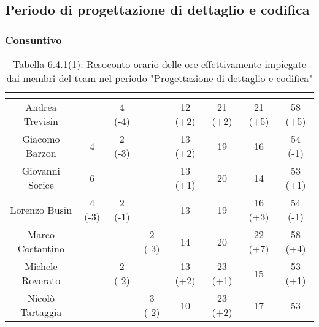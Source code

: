 \subsection{Periodo di progettazione di dettaglio e codifica}
\subsubsection{Consuntivo}
\renewcommand{\arraystretch}{1.5}
\begin{table}[H]
\begin{center}
\begin{tabular}{|c|c|c|c|c|c|c|c|}
\hline
\rowcolor{title_row}
\textbf{\color{title_text}{Nome}} & \textbf{\color{title_text}{Resp.}} & \textbf{\color{title_text}{Ammi.}} & \textbf{\color{title_text}{Analist.}} & \textbf{\color{title_text}{Progett.}} & \textbf{\color{title_text}{Program.}} & \textbf{\color{title_text}{Verific.}} & \textbf{\color{title_text}{Totale}} \\ \hline
Andrea Trevisin  & & 4 (-4) & & 12 (+2) & 21 (+2) & 21 (+5) & 58 (+5) \\ \hline
Giacomo Barzon   & 4 & 2 (-3) & & 13 (+2) & 19 & 16 & 54 (-1)  \\ \hline
Giovanni Sorice  & 6 & & & 13 (+1) & 20 & 14 & 53 (+1) \\ \hline
Lorenzo Busin    & 4 (-3) & 2 (-1) & & 13 & 19 & 16 (+3) & 54 (-1) \\ \hline
Marco Costantino & & & 2 (-3) & 14 & 20 & 22 (+7) & 58 (+4) \\ \hline     
Michele Roverato & & 2 (-2) & & 13 (+2) & 23 (+1) & 15 & 53 (+1) \\ \hline    
Nicolò Tartaggia & & & 3 (-2) & 10 & 23 (+2) & 17 & 53 \\ \hline
\end{tabular}
\caption{Tabella 6.4.1(1): Resoconto orario delle ore effettivamente impiegate dai membri del team nel periodo "Progettazione di dettaglio e codifica"\label{}}
\end{center}
\end{table}
\renewcommand{\arraystretch}{1}

